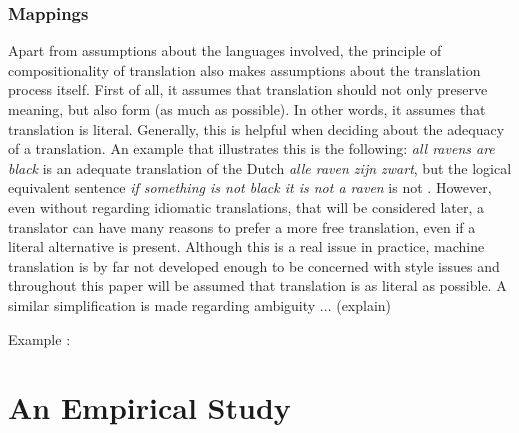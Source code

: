 \documentclass{report}
\theoremstyle{definition}
\theoremstyle{plain}
\begin{document}
\subsection{Mappings}

Apart from assumptions about the languages involved, the principle of compositionality of translation also makes assumptions about the translation process itself. First of all, it assumes that translation should not only preserve meaning, but also form (as much as possible). In other words, it assumes that translation is literal. Generally, this is helpful when deciding about the adequacy of a translation. An example that illustrates this is the following: \textit{all ravens are black} is an adequate translation of the Dutch \textit{alle raven zijn zwart}, but the logical equivalent sentence \textit{if something is not black it is not a raven} is not \citep{landsbergen1989power}.  However, even without regarding idiomatic translations, that will be considered later, a translator can have many reasons to prefer a more free translation, even if a literal alternative is present. Although this is a real issue in practice, machine translation is by far not developed enough to be concerned with style issues and throughout this paper will be assumed that translation is as literal as possible. A similar simplification is made regarding ambiguity ... (explain)

Example \cite{landsbergen1989power}: 









\chapter{An Empirical Study}
\end{document}
